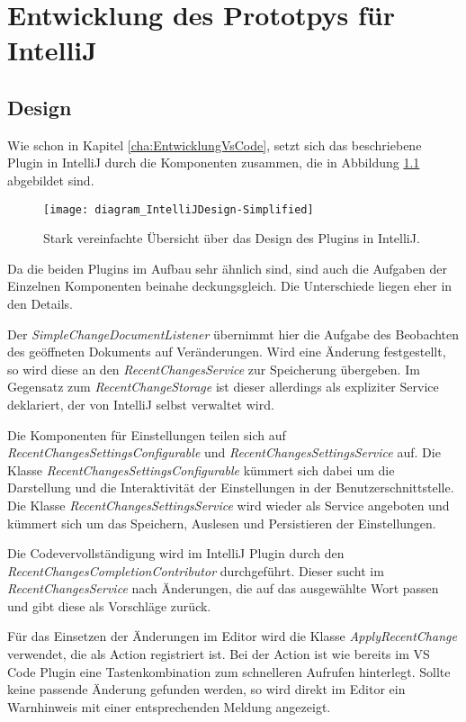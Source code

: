 \chapter{Entwicklung des Prototpys für IntelliJ}
\label{cha:EntwicklungIntelliJ}

\section{Design}
\label{sec:EntwicklungIntelliJ_Design}

Wie schon in Kapitel \ref{cha:EntwicklungVsCode}, setzt sich das 
beschriebene Plugin in IntelliJ durch die Komponenten zusammen,
die in Abbildung \ref{fig:diagram_IntelliJDesign-Simplified} abgebildet sind.

\begin{figure}
    \centering
    \texttt{[image: diagram\_IntelliJDesign-Simplified]}
    \caption{Stark vereinfachte Übersicht über das Design des Plugins in IntelliJ.}
    \label{fig:diagram_IntelliJDesign-Simplified}
\end{figure}

Da die beiden Plugins im Aufbau sehr ähnlich sind, sind auch die Aufgaben der
Einzelnen Komponenten beinahe deckungsgleich. Die Unterschiede liegen eher in
den Details.

Der \emph{SimpleChangeDocumentListener} übernimmt hier die Aufgabe
des Beobachten des geöffneten Dokuments auf Veränderungen. Wird
eine Änderung festgestellt, so wird diese an den \emph{RecentChangesService}
zur Speicherung übergeben. Im Gegensatz zum \emph{RecentChangeStorage}
ist dieser allerdings als expliziter Service deklariert, der von IntelliJ
selbst verwaltet wird.

Die Komponenten für Einstellungen teilen sich auf 
\emph{RecentChangesSettingsConfigurable} und \emph{RecentChangesSettingsService}
auf. Die Klasse \emph{RecentChangesSettingsConfigurable} kümmert sich dabei
um die Darstellung und die Interaktivität der Einstellungen in der Benutzerschnittstelle.
Die Klasse \emph{RecentChangesSettingsService} wird wieder als Service 
angeboten und kümmert sich um das Speichern, Auslesen und Persistieren
der Einstellungen.

Die Codevervollständigung wird im IntelliJ Plugin durch den
\emph{RecentChangesCompletionContributor} durchgeführt. Dieser
sucht im \emph{RecentChangesService} nach Änderungen, die auf
das ausgewählte Wort passen und gibt diese als Vorschläge zurück.

Für das Einsetzen der Änderungen im Editor wird die Klasse
\emph{ApplyRecentChange} verwendet, die als Action registriert ist.
Bei der Action ist wie bereits im VS Code Plugin eine Tastenkombination
zum schnelleren Aufrufen hinterlegt.
Sollte keine passende Änderung gefunden werden, so wird direkt im
Editor ein Warnhinweis mit einer entsprechenden Meldung angezeigt.

